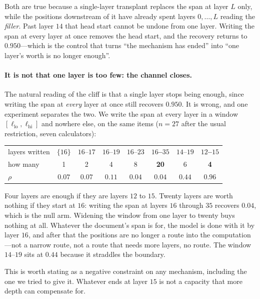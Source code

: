 \documentclass{article}
\begin{document}
Both are true because a single-layer transplant replaces the span at layer $L$
only, while the positions downstream of it have already spent layers
$0,\dots,L$ reading the \emph{filler}. Past layer $14$ that head start cannot be
undone from one layer. Writing the span at every layer at once removes the head
start, and the recovery returns to $0.950$---which is the control that turns
``the mechanism has ended'' into ``one layer's worth is no longer enough''.

\paragraph{It is not that one layer is too few: the channel closes.} The
natural reading of the cliff is that a single layer stops being enough, since
writing the span at \emph{every} layer at once still recovers $0.950$. It is
wrong, and one experiment separates the two. We write the span at every layer in
a window $[\ell_{\text{lo}}, \ell_{\text{hi}}]$ and nowhere else, on the same
items ($n=27$ after the usual restriction, seven calculators):

\begin{center}
\begin{tabular}{@{}lccccccc@{}}
\toprule
layers written & $\{16\}$ & $16$--$17$ & $16$--$19$ & $16$--$23$ &
\textbf{$16$--$35$} & $14$--$19$ & \textbf{$12$--$15$} \\
how many & 1 & 2 & 4 & 8 & \textbf{20} & 6 & \textbf{4} \\
\midrule
$\rho$ & $0.07$ & $0.07$ & $0.11$ & $0.04$ & $\mathbf{0.04}$ & $0.44$ &
$\mathbf{0.96}$ \\
\bottomrule
\end{tabular}
\end{center}

Four layers are enough if they are layers $12$ to $15$. Twenty layers are worth
nothing if they start at $16$: writing the span at layers $16$ through $35$
recovers $0.04$, which is the null arm. Widening the window from one layer to
twenty buys nothing at all. Whatever the document's span is for, the model is
done with it by layer $16$, and after that the positions are no longer a route
into the computation---not a narrow route, not a route that needs more layers,
no route. The window $14$--$19$ sits at $0.44$ because it straddles the
boundary.

This is worth stating as a negative constraint on any mechanism, including the
one we tried to give it. Whatever ends at layer $15$ is not a capacity that more
depth can compensate for.
\end{document}
